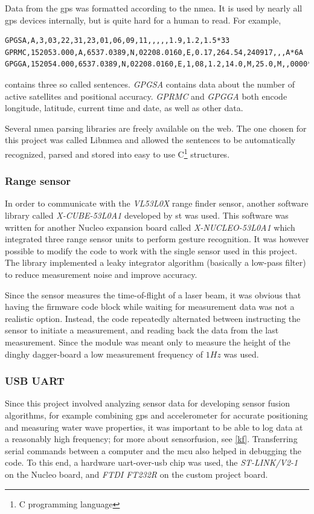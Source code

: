 Data from the \gls{gps} was formatted according to the \gls{nmea}. It is used by nearly all \gls{gps} devices internally, but is quite hard for a human to read. For example,
\begin{lstlisting}
GPGSA,A,3,03,22,31,23,01,06,09,11,,,,,1.9,1.2,1.5*33
GPRMC,152053.000,A,6537.0389,N,02208.0160,E,0.17,264.54,240917,,,A*6A
GPGGA,152054.000,6537.0389,N,02208.0160,E,1,08,1.2,14.0,M,25.0,M,,0000*68
\end{lstlisting}
contains three so called sentences. \emph{GPGSA} contains data about the number of active satellites and positional accuracy. \emph{GPRMC} and \emph{GPGGA} both encode longitude, latitude, current time and date, as well as other data.

Several \gls{nmea} parsing libraries are freely available on the web. The one chosen for this project was called Libnmea\cite{libnmea} and allowed the sentences to be automatically recognized, parsed and stored into easy to use C\footnote{C programming language} structures.

\subsubsection{Range sensor}
In order to communicate with the \emph{VL53L0X} range finder sensor, another software library called \emph{X-CUBE-53L0A1}\cite{x-cube-53l0a} developed by \gls{st} was used. This software was written for another Nucleo expansion board called \emph{X-NUCLEO-53L0A1} which integrated three range sensor units to perform gesture recognition. It was however possible to modify the code to work with the single sensor used in this project. The library implemented a leaky integrator algorithm (basically a low-pass filter) to reduce measurement noise and improve accuracy.

Since the sensor measures the time-of-flight of a laser beam, it was obvious that having the firmware code block while waiting for measurement data was not a realistic option. Instead, the code repeatedly alternated between instructing the sensor to initiate a measurement, and reading back the data from the last measurement. Since the module was meant only to measure the height of the dinghy dagger-board  a low measurement frequency of $1Hz$ was used.

\subsubsection{USB UART}
\label{usb-uart}
Since this project involved analyzing sensor data for developing sensor fusion algorithms, for example combining \gls{gps} and accelerometer for accurate positioning and measuring water wave properties, it was important to be able to log data at a reasonably high frequency; for more about sensorfusion, see \autoref{kf}. Transferring serial commands between a computer and the \gls{mcu} also helped in debugging the code. To this end, a hardware \gls{uart}-over-\gls{usb} chip was used, the \emph{ST-LINK/V2-1} on the Nucleo board, and \emph{FTDI FT232R} on the custom project board.

